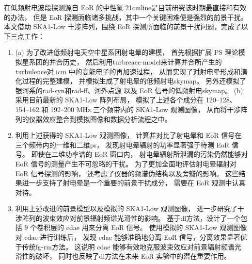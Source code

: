 
\begin{summary}

在低频射电波段探测源自 EoR 的中性氢 \ac{21cmline}是目前研究该时期最直接和有效的办法，
但是 EoR 探测面临诸多挑战，其中一个关键困难便是强烈的前景干扰。
本文借助 SKA1-Low 干涉阵列，围绕 EoR 探测所面临的前景干扰问题，完成了以下三点工作：
\begin{enumerate}
\item
(a) 为了改进低频射电天空中星系团射电晕的建模，
首先根据扩展 \ac{PS} 理论模拟星系团的并合历史，
然后利用\ac{turbreacc-model}来计算并合所产生的\ac{turbulence}对 \ac{icm}
中的高能电子的再加速过程，
从而实现了对射电晕形成和演化过程的完整建模，
并模拟生成了射电晕的低频射电\ac{skymap}。
另外还模拟了银河系的\ac{rad-syn}和\ac{rad-ff}、河外点源
以及 EoR 信号的低频射电\ac{skymap}。
(b) 采用目前最新的 SKA1-Low 阵列布局，
模拟了上述各个成分在 \numrange{120}{128}、\numrange{154}{162}
和 \numrange{192}{200} \si{\MHz} 三个频带内的 SKA1-Low 观测图像，
从而将干涉阵列的仪器效应整合到模拟图像和数据分析流程之中。

\item
利用上述获得的 SKA1-Low 观测图像，
计算并对比了射电晕和 EoR 信号在三个频带内的一维和二维\ac{ps}，
发现射电晕辐射的功率显著强于待测 EoR 信号。
即使在二维功率谱的 EoR 窗口内，
射电晕辐射所泄漏的污染仍然能够对 EoR 信号的测量产生不可忽略的干扰。
为了更加全面地评估射电晕辐射对 EoR 信号探测的影响，
还考虑了仪器的频谱伪结构以及旁瓣的影响。
这些结果进一步支持了射电晕是一个重要的前景干扰成分，
需要在 EoR 观测中认真对待。

\item
利用上述改进的前景模型以及模拟的 SKA1-Low 观测图像，
进一步研究了干涉阵列的波束效应对前景辐射频谱光滑性的影响。
基于\ac{dl}方法，设计了一个包括 9 个卷积层的 \ac{cdae} 用来分离 EoR 信号。
使用模拟的 SKA1-Low 观测图像对 \ac{cdae} 进行训练后，
发现 \ac{cdae} 能够准确地分离 EoR 信号，分离效果显著优于传统\ac{fg-rm}方法。
这说明 \ac{cdae} 能够有效地克服波束效应对前景辐射频谱光滑性的破坏，
同时也反映了\ac{dl}方法在未来 EoR 实验中的潜在重要作用。
\end{enumerate}



\end{summary}
